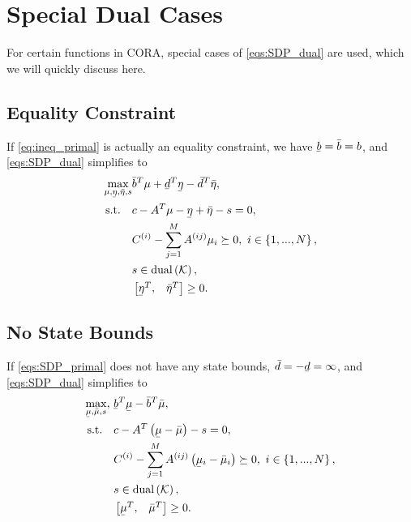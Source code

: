 \documentclass{article}
\newcommand{\f}[2]{#1\left(#2\right)}
\newcommand{\setdef}[2][]{
	\left\{
	\ifblank{#1}{}{#1 \hspace{.1cm} \middle| \hspace{.1cm}}
	#2
	\right\}
}
\newcommand{\set}[1]{\mathcal{#1}}
\newcommand{\ubar}[1]{\underaccent{\bar}{#1}}
\begin{document}
	\section{Special Dual Cases}
	For certain functions in CORA, special cases of \cref{eqs:SDP_dual} are used, which we will quickly discuss here.
		
		\subsection{Equality Constraint}
		If \cref{eq:ineq_primal} is actually an equality constraint, we have $\ubar{b} = \bar{b} = b$, and \cref{eqs:SDP_dual} simplifies to 
		\begin{subequations}\label{eqs:SDP_dual_equality}
			\begin{align}
				\max_{\mu,\ubar{\eta},\bar{\eta},s} &\bar{b}^T\mu +\ubar{d}^T\ubar{\eta}-\bar{d}^T\bar{\eta},\\
				\text{s.t.} \quad 	&c - A^T\mu -\ubar{\eta}+\bar{\eta} - s=0, \label{eq:SDP_dual_eq_equality}\\
				&C^{(i)}-\sum_{j=1}^{M}A^{(ij)}\mu_i \succeq 0, \ i\in\setdef{1,...,N},\\
				&s\in\f{\text{dual}}{\set{K}},\\
				&\begin{bmatrix}\ubar{\eta}^T,&\bar{\eta}^T\end{bmatrix}\geq 0.
			\end{align}
		\end{subequations}
	
		\subsection{No State Bounds}
		If \cref{eqs:SDP_primal} does not have any state bounds, $\bar{d} = -\ubar{d} = \infty$, and \cref{eqs:SDP_dual} simplifies to
		\begin{subequations}
			\begin{align}
				\max_{\ubar{\mu},\bar{\mu},s},\ &\ubar{b}^T\ubar{\mu} - \bar{b}^T\bar{\mu},\\
				\text{s.t.} \quad 	&c - A^T\left(\ubar{\mu}-\bar{\mu}\right) - s=0,\\
				&C^{(i)}-\sum_{j=1}^{M}A^{(ij)}\left(\ubar{\mu}_i-\bar{\mu}_i\right) \succeq 0, \ i\in\setdef{1,...,N},\\
				&s\in\f{\text{dual}}{\set{K}},\\
				&\begin{bmatrix}\ubar{\mu}^T,&\bar{\mu}^T\end{bmatrix}\geq 0.
			\end{align}
		\end{subequations}
		
\end{document}
